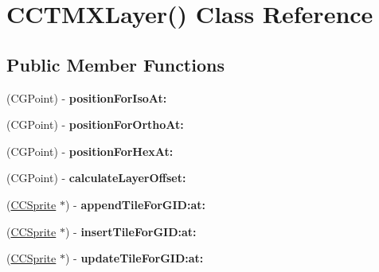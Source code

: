\hypertarget{interface_c_c_t_m_x_layer_07_08}{\section{C\-C\-T\-M\-X\-Layer() Class Reference}
\label{interface_c_c_t_m_x_layer_07_08}
}
\subsection*{Public Member Functions}
\begin{DoxyCompactItemize}
\item 
\hypertarget{interface_c_c_t_m_x_layer_07_08_a59d6c155c471eba6b583e1a84c89e029}{(C\-G\-Point) -\/ {\bfseries position\-For\-Iso\-At\-:}}\label{interface_c_c_t_m_x_layer_07_08_a59d6c155c471eba6b583e1a84c89e029}

\item 
\hypertarget{interface_c_c_t_m_x_layer_07_08_ac5f37bafcc5664e7c9f0c6247959a757}{(C\-G\-Point) -\/ {\bfseries position\-For\-Ortho\-At\-:}}\label{interface_c_c_t_m_x_layer_07_08_ac5f37bafcc5664e7c9f0c6247959a757}

\item 
\hypertarget{interface_c_c_t_m_x_layer_07_08_ac6839d411ab8555edc8e522dd6dac9c9}{(C\-G\-Point) -\/ {\bfseries position\-For\-Hex\-At\-:}}\label{interface_c_c_t_m_x_layer_07_08_ac6839d411ab8555edc8e522dd6dac9c9}

\item 
\hypertarget{interface_c_c_t_m_x_layer_07_08_a442d75263950bf3b122ba08c56122ca4}{(C\-G\-Point) -\/ {\bfseries calculate\-Layer\-Offset\-:}}\label{interface_c_c_t_m_x_layer_07_08_a442d75263950bf3b122ba08c56122ca4}

\item 
\hypertarget{interface_c_c_t_m_x_layer_07_08_a2c92882228b22a6f2020316f21010d22}{(\hyperlink{class_c_c_sprite}{C\-C\-Sprite} $\ast$) -\/ {\bfseries append\-Tile\-For\-G\-I\-D\-:at\-:}}\label{interface_c_c_t_m_x_layer_07_08_a2c92882228b22a6f2020316f21010d22}

\item 
\hypertarget{interface_c_c_t_m_x_layer_07_08_a5d5edf460f976a64069bd1e782ba5f16}{(\hyperlink{class_c_c_sprite}{C\-C\-Sprite} $\ast$) -\/ {\bfseries insert\-Tile\-For\-G\-I\-D\-:at\-:}}\label{interface_c_c_t_m_x_layer_07_08_a5d5edf460f976a64069bd1e782ba5f16}

\item 
\hypertarget{interface_c_c_t_m_x_layer_07_08_a9a7a24971fb4010a20139d807e68db69}{(\hyperlink{class_c_c_sprite}{C\-C\-Sprite} $\ast$) -\/ {\bfseries update\-Tile\-For\-G\-I\-D\-:at\-:}}\label{interface_c_c_t_m_x_layer_07_08_a9a7a24971fb4010a20139d807e68db69}


\end{DoxyCompactItemize}
